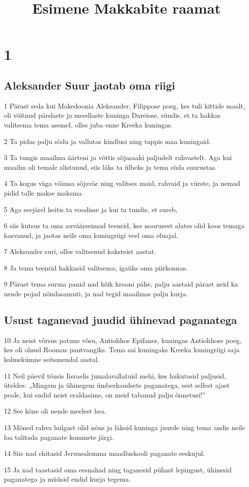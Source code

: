 

\title{Esimene Makkabite raamat}

\chapter{1}

\section*{Aleksander Suur jaotab oma riigi}

\par 1 Pärast seda kui Makedoonia Aleksander, Filippose poeg, kes tuli kittide maalt, oli võitnud pärslaste ja meedlaste kuninga Dareiose, sündis, et ta hakkas valitsema tema asemel, olles juba enne Kreeka kuningas.
\par 2 Ta pidas palju sõdu ja vallutas kindlusi ning tappis maa kuningaid.
\par 3 Ta tungis maailma äärteni ja võttis sõjasaaki paljudelt rahvastelt. Aga kui maailm oli temale alistunud, siis läks ta ülbeks ja tema süda suurustas.
\par 4 Ta kogus väga võimsa sõjaväe ning valitses maid, rahvaid ja vürste, ja nemad pidid talle makse maksma.
\par 5 Aga seejärel heitis ta voodisse ja kui ta tundis, et sureb,
\par 6 siis kutsus ta oma auväärseimad teenrid, kes noorusest alates olid koos temaga kasvanud, ja jaotas neile oma kuningriigi veel oma eluajal.
\par 7 Aleksander suri, olles valitsenud kaksteist aastat.
\par 8 Ja tema teenrid hakkasid valitsema, igaüks oma piirkonnas.
\par 9 Pärast tema surma panid nad kõik krooni pähe, palju aastaid pärast neid ka nende pojad nõndasamuti, ja nad tegid maailmas palju kurja. 

\section*{Usust taganevad juudid ühinevad paganatega}

\par 10 Ja neist võrsus patune võsu, Antiohhos Epifanes, kuningas Antiohhose poeg, kes oli olnud Roomas pantvangiks. Tema sai kuningaks Kreeka kuningriigi saja kolmekümne seitsmendal aastal.
\par 11 Neil päevil tõusis Iisraelis jumalavallatuid mehi, kes hukutasid paljusid, üteldes: „Mingem ja ühinegem ümberkaudsete paganatega, sest sellest ajast peale, kui endid neist eraldasime, on meid tabanud palju õnnetusi!”
\par 12 See kõne oli nende meelest hea.
\par 13 Mõned rahva hulgast olid nõus ja läksid kuninga juurde ning tema andis neile loa talitada paganate kommete järgi.
\par 14 Siis nad ehitasid Jeruusalemma maadluskooli paganate eeskujul.
\par 15 Ja nad taastasid oma eesnahad ning taganesid pühast lepingust, ühinesid paganatega ja müüsid endid kurja tegema. 

